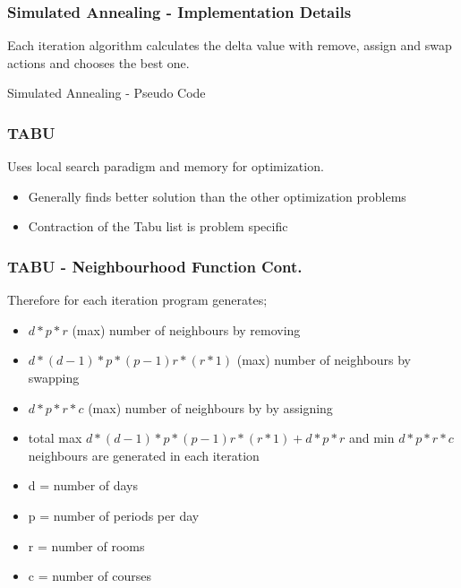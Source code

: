 \documentclass{beamer}
\makeatletter
\newenvironment{algorithm}[1][]{%
  \def\@captype{algorithm}%
  \par\nobreak\begin{center}\nobreak}
  {\par\nobreak\end{center}\nobreak}
\newcounter{algorithm}
\makeatother
\begin{document}
\begin{frame}[shrink=20]
\frametitle{Simulated Annealing  - Implementation Details}
Each iteration algorithm calculates the delta value with remove, assign and swap actions and chooses the best one. 
\begin{algorithm}[H]
\begin{algorithmic}[1]
\REPEAT
\REPEAT
{}
\ENDIF
{}
\end{algorithmic}
\caption{Simulated Annealing - Pseudo Code}
\label{alg:seq}
\end{algorithm}
\end{frame}

\begin{frame}
\frametitle{TABU}
Uses local search paradigm and memory for optimization.
\begin{itemize}
\item Generally finds better solution than the other optimization problems
\item Contraction of the Tabu list is problem specific
\end{itemize}
\end{frame}

\begin{frame}
\frametitle{TABU - Neighbourhood Function Cont.}
Therefore for each iteration program generates;
\begin{itemize}
\item  $ d*p*r$ (max) number of neighbours by removing
\item  $d*(d-1)*p*(p-1)r*(r*1) $ (max) number of neighbours by swapping 
\item $ d*p*r*c$ (max) number of neighbours by by assigning
\item total max $d*(d-1)*p*(p-1)r*(r*1) + d*p*r $ and min $ d*p*r*c$ neighbours are generated in each iteration
\item d = number of days
\item p = number of periods per day
\item r = number of rooms
\item c = number of courses
\end{itemize}
\end{frame}
\end{document}
